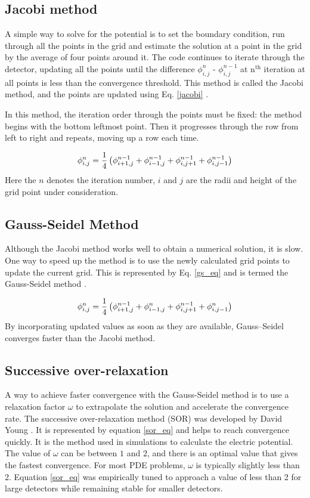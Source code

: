 \subsection*{Jacobi method}
A simple way to solve for the potential is to set the boundary condition, run through all the points in the grid and estimate the solution at a point in the grid by the average of four points around it. The code continues to iterate through the detector, updating all the points until the difference $\phi_{i,j}^{n}$ - $\phi_{i,j}^{n-1}$ at n$^{\text{th}}$ iteration at all points is less than the convergence threshold. This method is called the Jacobi method, and the points are updated using Eq. \ref{jacobi} \cite{Varga2000}. 

In this method, the iteration order through the points must be fixed: the method begins with the bottom leftmost point. Then it progresses through the row from left to right and repeats, moving up a row each time.


\begin{equation}{\label{jacobi}}
 \phi_{i,j}^{n} = \frac{1}{4}  \left(\phi^{n-1}_{i+1,j} + \phi^{n-1}_{i-1,j} + \phi^{n-1}_{i,j+1} + \phi^{n-1}_{i,j-1} \right)
\end{equation}
Here the $n$ denotes the iteration number, $i$ and $j$ are the radii and height of the grid point under consideration. 

\subsection*{Gauss-Seidel Method}
Although the Jacobi method works well to obtain a numerical solution, it is slow. One way to speed up the method is to use the newly calculated grid points to update the current grid. This is represented by Eq. \ref{gs_eq} and is termed the Gauss-Seidel method \cite{Varga2000}.

\begin{equation}{\label{gs_eq}}
 \phi_{i,j}^{n} = \frac{1}{4}  \left(\phi^{n-1}_{i+1,j} + \phi^n_{i-1,j} + \phi^{n-1}_{i,j+1} + \phi^n_{i,j-1} \right)
\end{equation}
By incorporating updated values as soon as they are available, Gauss--Seidel converges faster than the Jacobi method.

\subsection*{Successive over-relaxation}
A way to achieve faster convergence with the Gauss-Seidel method is to use a relaxation factor $\omega$ to extrapolate the solution and accelerate the convergence rate. The successive over-relaxation method (SOR) was developed by David Young \cite{Young1950}. It is represented by equation \ref{sor_eq} and helps to reach convergence quickly. It is the method used in {\siggen} simulations to calculate the electric potential. The value of $\omega$ can be between $1$ and $2$, and there is an optimal value that gives the fastest convergence. For most PDE problems, $\omega$ is typically slightly less than 2. Equation \ref{sor_eq} was empirically tuned to approach a value of less than 2 for large detectors while remaining stable for smaller detectors.

